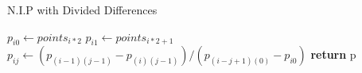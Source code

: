 \documentclass{article}
\begin{document}
  \begin{algorithm}
    \caption{N.I.P with Divided Differences}
    \begin{algorithmic}[1]
          \State $p_{i0} \gets points_{i * 2}$
          \State $p_{i1} \gets points_{i * 2 + 1}$
        \EndFor
            \State $p_{ij} \gets (p_{(i - 1)(j - 1)} - p_{(i)(j - 1)}) /
            (p_{(i - j + 1)(0)} - p_{i0})$
          \EndFor
        \EndFor
        \State \textbf{return} p
      \EndProcedure
    \end{algorithmic}
  \end{algorithm}
\end{document}
